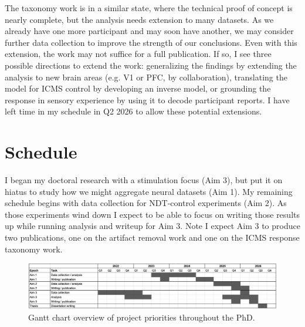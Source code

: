 \documentclass[12pt,oneside]{report}
\begin{document}
The taxonomy work is in a similar state, where the technical proof of concept is nearly complete, but the analysis needs extension to many datasets. As we already have one more participant and may soon have another, we may consider further data collection to improve the strength of our conclusions. Even with this extension, the work may not suffice for a full publication. If so, I see three possible directions to extend the work: generalizing the findings by extending the analysis to new brain areas (e.g. V1 or PFC, by collaboration), translating the model for ICMS control by developing an inverse model, or grounding the response in sensory experience by using it to decode participant reports. I have left time in my schedule in Q2 2026 to allow these potential extensions.


\chapter{Schedule}
I began my doctoral research with a stimulation focus (Aim 3), but put it on hiatus to study how we might aggregate neural datasets (Aim 1). My remaining schedule begins with data collection for NDT-control experiments (Aim 2). As those experiments wind down I expect to be able to focus on writing those results up while running analysis and writeup for Aim 3. Note I expect Aim 3 to produce two publications, one on the artifact removal work and one on the ICMS response taxonomy work.

\begin{figure}[h]
  \centering
  \includegraphics[width=1.0\linewidth]{ch5_schedule_gantt.png}
  \caption{Gantt chart overview of project priorities throughout the PhD.}
  \label{fig:schedule}
\end{figure}

\cleardoublepage
\printbibliography
\end{document}
